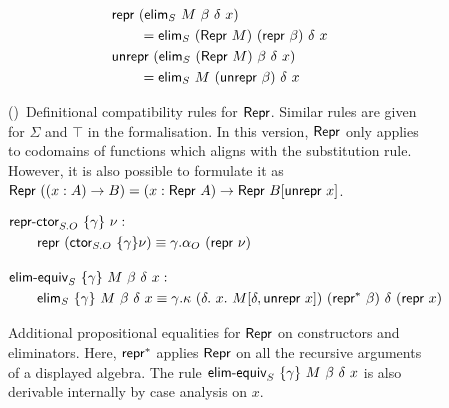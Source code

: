 \begin{figure}[H]
\begin{minipage}[t]{0.5\textwidth}
\begin{align*}
  & \textsf{repr}\ (\textsf{elim}_S\ M\ \beta\ \delta\ x) \\ &\qquad = \textsf{elim}_S\ (\textsf{Repr}\ M)\ (\textsf{repr}\ \beta)\ \delta\ x \\
  & \textsf{unrepr}\ (\textsf{elim}_S\ (\textsf{Repr}\ M)\ \beta\ \delta\ x)\\ &\qquad = \textsf{elim}_S\ M\ (\textsf{unrepr}\ \beta)\ \delta\ x
  \end{align*}
  \end{minipage}%
  \caption{()\
  Definitional compatibility rules for $\textsf{Repr}$. Similar rules are given for
  $\Sigma$ and $\top$ in the formalisation. In this version, $\textsf{Repr}$ only applies to codomains
  of functions which aligns with the substitution rule. However, it is also
  possible to formulate it as \\ $\textsf{Repr}\ ((x : A) \to B) = (x : \textsf{Repr}\ A) \to \textsf{Repr}\ B[\textsf{unrepr}\ x]$.}
  \label{fig:lambdaind-repr-coherence-pi-univ}
\end{figure}

\begin{figure}[H]
  \begin{align*}
  & \mta{repr-ctor}_{S.O}\ \{\gamma\}\ \nu : \\ & \qquad \Mrepr\ (\Mctor_{S.O}\ \{\gamma\} \nu) \equiv \gamma.\alpha_O\ (\Mrepr\ \nu) \\[1em]
  & \mta{elim-equiv}_{S}\ \{\gamma\}\ M\ \beta\ \delta\ x :  \\ & \qquad
  \mta{elim}_{S}\ \{\gamma\}\ M\ \beta\ \delta\ x \equiv \gamma.\kappa\ (\delta.\ x.\ M[\delta, \Munrepr\ x])\ (\Mrepr^*\ \beta)\ \delta\ (\Mrepr\ x)
  \end{align*}
  \caption{Additional propositional equalities for $\textsf{Repr}$ on constructors and eliminators. Here, $\textsf{repr}^*$ applies $\textsf{Repr}$ on all the recursive
    arguments of a displayed algebra. The rule $\mta{elim-equiv}_{S}\ \{\gamma\}\ M\ \beta\ \delta\ x$ is also derivable internally by case analysis
    on $x$.}
\end{figure}
